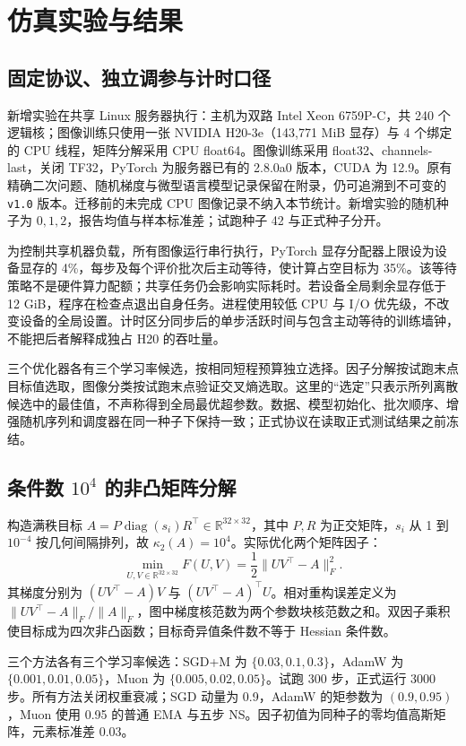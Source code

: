 \section{仿真实验与结果}\label{sec:new-experiments}
\subsection{固定协议、独立调参与计时口径}
新增实验在共享 Linux 服务器执行：主机为双路 Intel Xeon 6759P-C，共 240 个逻辑核；图像训练只使用一张 NVIDIA H20-3e（143,771 MiB 显存）与 4 个绑定的 CPU 线程，矩阵分解采用 CPU float64。图像训练采用 float32、channels-last，关闭 TF32，PyTorch 为服务器已有的 2.8.0a0 版本，CUDA 为 12.9。原有精确二次问题、随机梯度与微型语言模型记录保留在附录，仍可追溯到不可变的 \texttt{v1.0} 版本。迁移前的未完成 CPU 图像记录不纳入本节统计。新增实验的随机种子为 $0,1,2$，报告均值与样本标准差；试跑种子 42 与正式种子分开。

为控制共享机器负载，所有图像运行串行执行，PyTorch 显存分配器上限设为设备显存的 4\%，每步及每个评价批次后主动等待，使计算占空目标为 35\%。该等待策略不是硬件算力配额；共享任务仍会影响实际耗时。若设备全局剩余显存低于 12 GiB，程序在检查点退出自身任务。进程使用较低 CPU 与 I/O 优先级，不改变设备的全局设置。计时区分同步后的单步活跃时间与包含主动等待的训练墙钟，不能把后者解释成独占 H20 的吞吐量。

三个优化器各有三个学习率候选，按相同短程预算独立选择。因子分解按试跑末点目标值选取，图像分类按试跑末点验证交叉熵选取。这里的“选定”只表示所列离散候选中的最佳值，不声称得到全局最优超参数。数据、模型初始化、批次顺序、增强随机序列和调度器在同一种子下保持一致；正式协议在读取正式测试结果之前冻结。

\subsection{\texorpdfstring{条件数 $10^4$}{条件数 10000} 的非凸矩阵分解}
构造满秩目标 $A=P\operatorname{diag}(s_i)R^\top\in\mathbb R^{32\times32}$，其中 $P,R$ 为正交矩阵，$s_i$ 从 1 到 $10^{-4}$ 按几何间隔排列，故 $\kappa_2(A)=10^4$。实际优化两个矩阵因子：
\begin{equation}\label{eq:factorization}
 \min_{U,V\in\mathbb R^{32\times32}}
 F(U,V)=\frac12\|UV^\top-A\|_F^2.
\end{equation}
其梯度分别为 $(UV^\top-A)V$ 与 $(UV^\top-A)^\top U$。相对重构误差定义为 $\|UV^\top-A\|_F/\|A\|_F$，图中梯度核范数为两个参数块核范数之和。双因子乘积使目标成为四次非凸函数；目标奇异值条件数不等于 Hessian 条件数。

三个方法各有三个学习率候选：SGD+M 为 $\{0.03,0.1,0.3\}$，AdamW 为 $\{0.001,0.01,0.05\}$，Muon 为 $\{0.005,0.02,0.05\}$。试跑 300 步，正式运行 3000 步。所有方法关闭权重衰减；SGD 动量为 0.9，AdamW 的矩参数为 $(0.9,0.95)$，Muon 使用 0.95 的普通 EMA 与五步 NS。因子初值为同种子的零均值高斯矩阵，元素标准差 0.03。

